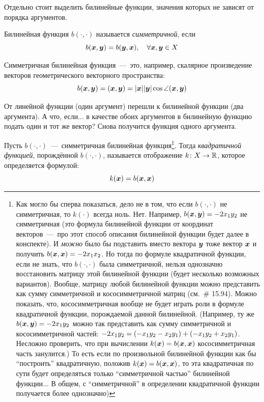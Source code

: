 \documentclass[a4paper,12pt]{article}
\begin{document}
  Отдельно стоит выделить билинейные функции, значения которых не зависят от порядка аргументов.
  
  \begin{definition}
    Билинейная функция $b(\cdot, \cdot)$ называется \emph{симметричной}, если
    \[
      b(\boldsymbol x, \boldsymbol y) = b(\boldsymbol y, \boldsymbol x),\quad \forall \boldsymbol x, \boldsymbol y \in X
    \]
  \end{definition}
  
  \begin{example}
    Симметричная билинейная функция~---~это, например, скалярное произведение векторов геометрического векторного пространства:
    \begin{equation}\label{eq:bili-example}
      b(\boldsymbol x, \boldsymbol y) = (\boldsymbol x, \boldsymbol y) = |\boldsymbol x| |\boldsymbol y| \cos\angle(\boldsymbol x, \boldsymbol y)
    \end{equation}
  \end{example}
  
  От линейной функции (один аргумент) перешли к билинейной функции (два аргумента).
  А что, если...
  в качестве обоих аргументов в билинейную функцию подать один и тот же вектор?
  Снова получится функция одного аргумента.
  
  \begin{definition}
    Пусть $b(\cdot, \cdot)$~---~симметричная билинейная функция\footnote{
      Как могло бы сперва показаться, дело не в том, что если $b(\cdot, \cdot)$ не симметричная, то $k(\cdot)$ всегда ноль.
      Нет.
      Например, $b(\bds x, \bds y) \hm= -2 x_1 y_2$ не симметричная (это формула билинейной функции от координат векторов~---~про этот способ описания билинейной функции будет далее в конспекте).
      И \emph{можно} было бы подставить вместо вектора $\boldsymbol y$ тоже вектор $\boldsymbol x$ и получить $b(\bds x, \bds x) \hm= -2 x_1 x_2$.
      Но тогда по формуле квадратичной функции, если не знать, что $b(\cdot, \cdot)$ была симметричной, нельзя однозначно восстановить матрицу этой билинейной функции (будет несколько возможных вариантов).
      Вообще, матрицу любой билинейной функции можно представить как сумму симметричной и кососимметричной матриц (см.~\# 15.94).
      Можно показать, что, кососимметричная вообще не будет играть роли в формуле квадратичной функции, порождаемой данной билинейной.
      (Например, ту же $b(\bds x, \bds y) \hm= -2 x_1 y_2$ можно так представить как сумму симметричной и кососимметричной частей: $-2 x_1 y_2 \hm= (-x_1 y_2 \hm- x_2 y_1) \hm+ (-x_1 y_2 \hm+ x_2 y_1)$.
      Несложно проверить, что при вычислении $k(\bds x) \hm= b(\bds x, \bds x)$ кососимметричная часть занулится.)
      То есть если по произвольной билинейной функции как бы ``построить'' квадратичную, положив $k(\bds x) \hm= b(\bds x, \bds x)$, то эта квадратичная по сути будет определяться только ``симметричной частью'' билинейной функции...
      В общем, с ``симметричной'' в определении квадратичной функции получается более однозначно)
    }.  %
    Тогда \emph{квадратичной функцией}, порождённой $b(\cdot, \cdot)$, называется отображение $k\colon X \hm\to \RR$, которое определяется формулой:
    \[
      k(\boldsymbol x) = b(\boldsymbol x, \boldsymbol x)
    \]
  \end{definition}
  
\end{document}
